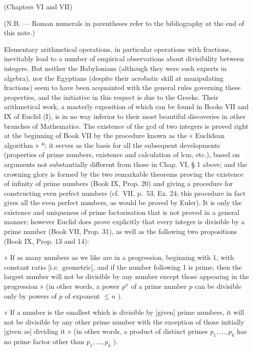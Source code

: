 
(Chapters VI and VII)

(N.B. --- Roman numerals in parentheses refer to the bibliography at the end of this note.)

Elementary arithmetical operations, in particular operations with fractions, inevitably lead to a number of empirical observations about divisibility between integers. But neither the Babylonians (although they were such experts in algebra), nor the Egyptians (despite their acrobatic skill at manipulating fractions) seem to have been acquainted with the general rules governing these properties, and the initiative in this respect is due to the Greeks. Their arithmetical work, a masterly exposition of which can be found in Books VII and IX of Euclid (I), is in no way inferior to their most beautiful discoveries in other branches of Mathematics. The existence of the gcd of two integers is proved right at the beginning of Book VII by the procedure known as the « Euclidean algorithm » *; it serves as the basis for all the subsequent developments (properties of prime numbers, existence and calculation of lcm, etc.), based on arguments not substantially different from those in Chap. VI, § 1 above; and the crowning glory is formed by the two remarkable theorems proving the existence of infinity of prime numbers (Book IX, Prop. 20) and giving a procedure for constructing even perfect numbers (cf.~VII, p.~53, Ex. 24; this procedure in fact gives all the even perfect numbers, as would be proved by Euler). It is only the existence and uniqueness of prime factorisation that is not proved in a general manner; however Euclid does prove explicitly that every integer is divisible by a prime number (Book VII, Prop. 31), as well as the following two propositions (Book IX, Prop. 13 and 14):

« If as many numbers as we like are in a progression, beginning with 1, with constant ratio {[}i.e.~geometric{]}, and if the number following 1 is prime, then the largest number will not be divisible by any number except those appearing in the progression » (in other words, a power \(p^n\) of a prime number \(p\) can be divisible only by powers of \(p\) of exponent \(\leqslant n\) ).

« If a number is the smallest which is divisible by {[}given{]} prime numbers, it will not be divisible by any other prime number with the exception of those initially {[}given as{]} dividing it » (in other words, a product of distinct primes \(p_{1}, \ldots, p_{k}\) has no prime factor other than \(p_{1}, \ldots, p_{k}\) ).

